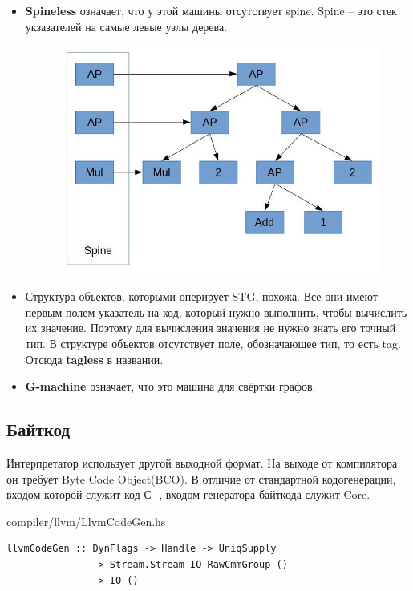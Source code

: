\documentclass[fontsize=14pt, paper=a4, pagesize, DIV=calc]{scrartcl}
\begin{document}
\begin{itemize}

\item \textbf{Spineless} означает, что у этой машины отсутствует spine. Spine -- это стек
укзазателей на самые левые узлы дерева.

\begin{figure}[H]
\centering
\includegraphics[scale=0.7]{spine.jpg}
\end{figure}

\item Структура объектов, которыми оперирует STG, похожа. Все они имеют первым
полем указатель на код, который нужно выполнить, чтобы вычислить их значение.
Поэтому для вычисления значения не нужно знать его точный тип. В структуре
объектов отсутствует поле, обозначающее тип, то есть tag. Отсюда \textbf{tagless} в
названии.

\item \textbf{G-machine} означает, что это машина для свёртки графов.

\end{itemize}

\subsection{Байткод}

Интерпретатор использует другой выходной формат. На выходе от компилятора он
требует Byte Code Object(BCO). В отличие от стандартной кодогенерации, входом
которой служит код С-{}-, входом генератора байткода служит Core.

\begin{ListingEnv}
\caption{compiler/llvm/LlvmCodeGen.hs}
\begin{lstlisting}[firstnumber=44]
llvmCodeGen :: DynFlags -> Handle -> UniqSupply
               -> Stream.Stream IO RawCmmGroup ()
               -> IO ()
\end{lstlisting}
\end{ListingEnv}
\end{document}
